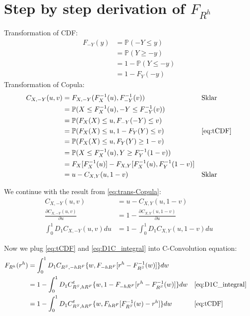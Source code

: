\documentclass[11pt, leqno]{article}
\numberwithin{equation}{section}
\begin{document}
    \section{Step by step derivation of $F_{R^h}$}\label{sec:steps}
Transformation of CDF:
    \begin{align}
        F_{-Y}(y)
        &= \mathbb{P}(-Y \leq y) \nonumber\\
        &= \mathbb{P}(Y \geq -y) \nonumber\\
        &= 1 - \mathbb{P}(Y \leq -y)\nonumber\\
        &= 1 - F_{Y}(-y)   \label{eq:tCDF}
    \end{align}
Transformation of Copula:
    \begin{align}
        C_{X,-Y}(u,v) &=
        F_{X,-Y}(F_X^{-1}(u),F_{-Y}^{-1}(v)) &&\text{Sklar}\nonumber\\
        &=
        \mathbb{P}(X \leq F_X^{-1}(u), -Y \leq F_{-Y}^{-1}(v)) \nonumber\\
        &=
        \mathbb{P}(F_X(X) \leq u, F_{-Y}(-Y) \leq v) \nonumber\\
        &=
        \mathbb{P}(F_X(X) \leq u, 1-F_{Y}(Y) \leq v) && \text{\eqref{eq:tCDF}}\nonumber\\
        &=
        \mathbb{P}(F_X(X) \leq u, F_{Y}(Y) \geq 1-v) \nonumber\\
        &=
        \mathbb{P}(X \leq F_X^{-1}(u), Y \geq F_Y^{-1}(1-v)) \nonumber\\
        &=
        F_X[F_X^{-1}(u)] - F_{X,Y}[F_X^{-1}(u), F_Y^{-1}(1-v)] \nonumber\\
        &=
        u - C_{X,Y}(u, 1-v) &&\text{Sklar} \label{eq:trans-Copula}
    \end{align}

We continue with the result from \eqref{eq:trans-Copula}:
    \begin{align}
        C_{X,-Y}(u,v) &= u - C_{X,Y}(u, 1-v)\nonumber\\
        \frac{\partial C_{X,-Y}(u,v)}{\partial u} &= 1 - \frac{\partial C_{X,Y}(u, 1-v)}{\partial u} \nonumber\\
        \int^1_0 D_1 C_{X,-Y}(u,v)du &= 1 - \int^1_0 D_1 C_{X,Y}(u,1-v)du \label{eq:D1C_integral}
    \end{align}

Now we plug \eqref{eq:tCDF} and \eqref{eq:D1C_integral} into C-Convolution equation:
    \begin{align*}
        F_{R^h}(r^h) &= \int^1_0 D_1 C_{R^S, -hR^F}
        \{w,
        F_{-hR^F}[r^h - F^{-1}_{R^S}(w)
        ]\}dw \\
        &= 1 - \int^1_0 D_1C^t_{R^S, hR^F}
        \{w,
        1- F_{-hR^F}[r^h - F^{-1}_{R^S}(w)
        ]\}dw && \text{\eqref{eq:D1C_integral}}\\
        &= 1 - \int^1_0 D_1C^t_{R^S, hR^F}
        \{w,
        F_{hR^F}[F^{-1}_{R^S}(w) - r^h
        ]\}dw && \text{\eqref{eq:tCDF}}
    \end{align*}
\end{document}
